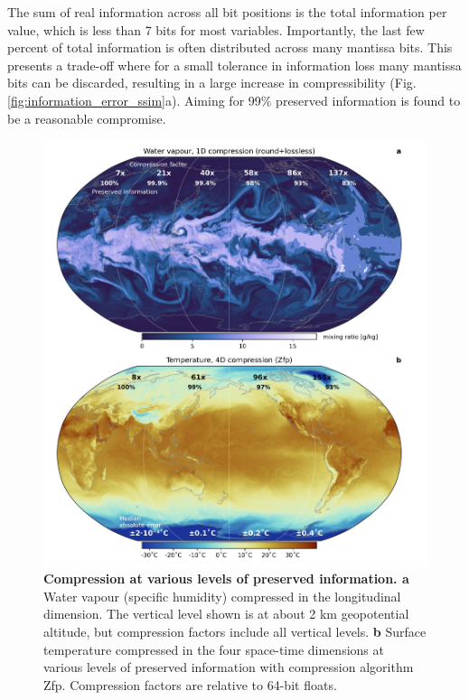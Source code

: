 The sum of real information across all bit positions is the total information per value, which is less than 7 bits for
most variables. Importantly, the last few percent of total information is often distributed across many mantissa bits.
This presents a trade-off where for a small tolerance in information loss many mantissa bits can be discarded,
resulting in a large increase in compressibility (Fig. \ref{fig:information_error_ssim}a). 
Aiming for 99\% preserved information is found to be a reasonable compromise.

\begin{figure}[tbhp]
	\includegraphics[width=1\textwidth]{Figures/compression/map_water_temp.png}
	\caption{\textbf{Compression at various levels of preserved information. a}
	Water vapour (specific humidity) compressed in the longitudinal dimension. 
	The vertical level shown is at about 2 km geopotential altitude, but compression 
	factors include all vertical levels. \textbf{b} Surface temperature compressed in the
	four space-time dimensions at various levels of preserved information with compression
	algorithm Zfp. Compression factors are relative to 64-bit floats.}
	\label{fig:map_roundlossless_zfp}
\end{figure}

